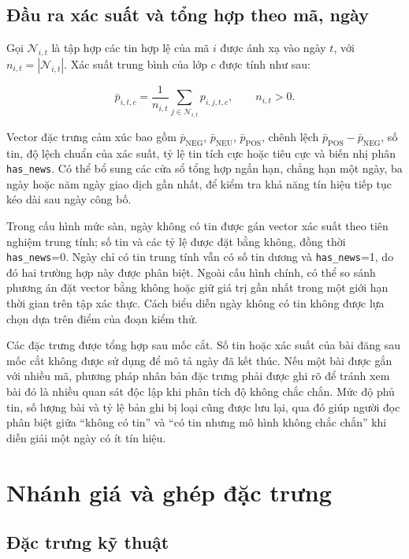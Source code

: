 \documentclass[12pt, a4paper, oneside]{report}
\begin{document}
\subsection{Đầu ra xác suất và tổng hợp theo mã, ngày}

Gọi $\mathcal{N}_{i,t}$ là tập hợp các tin hợp lệ của mã $i$ được ánh xạ vào ngày $t$, với
$n_{i,t}=|\mathcal{N}_{i,t}|$. Xác suất trung bình của lớp $c$ được tính như sau:

\begin{equation}
  \bar p_{i,t,c}=\frac{1}{n_{i,t}}
  \sum_{j\in\mathcal{N}_{i,t}}p_{i,j,t,c},
  \qquad n_{i,t}>0.
  \label{eq:daily-sentiment}
\end{equation}

Vector đặc trưng cảm xúc bao gồm $\bar p_{\mathrm{NEG}}$, $\bar p_{\mathrm{NEU}}$,
$\bar p_{\mathrm{POS}}$, chênh lệch $\bar p_{\mathrm{POS}}-\bar p_{\mathrm{NEG}}$,
số tin, độ lệch chuẩn của xác suất, tỷ lệ tin tích cực hoặc tiêu cực và biến nhị phân
\texttt{has\_news}. Có thể bổ sung các cửa sổ tổng hợp ngắn hạn, chẳng hạn một ngày, ba ngày
hoặc năm ngày giao dịch gần nhất, để kiểm tra khả năng tín hiệu tiếp tục kéo dài sau ngày
công bố.

Trong cấu hình mức sàn, ngày không có tin được gán vector xác suất theo tiên nghiệm trung
tính; số tin và các tỷ lệ được đặt bằng không, đồng thời \texttt{has\_news}=0. Ngày chỉ có
tin trung tính vẫn có số tin dương và \texttt{has\_news}=1, do đó hai trường hợp này được
phân biệt. Ngoài cấu hình chính, có thể so sánh phương án đặt vector bằng không hoặc giữ giá
trị gần nhất trong một giới hạn thời gian trên tập xác thực. Cách biểu diễn ngày không có tin
không được lựa chọn dựa trên điểm của đoạn kiểm thử.

Các đặc trưng được tổng hợp sau mốc cắt. Số tin hoặc xác suất của bài đăng sau mốc cắt không
được sử dụng để mô tả ngày đã kết thúc. Nếu một bài được gắn với nhiều mã, phương pháp nhân
bản đặc trưng phải được ghi rõ để tránh xem bài đó là nhiều quan sát độc lập khi phân tích
độ không chắc chắn. Mức độ phủ tin, số lượng bài và tỷ lệ bản ghi bị loại cũng được lưu lại,
qua đó giúp người đọc phân biệt giữa ``không có tin'' và ``có tin nhưng mô hình không chắc
chắn'' khi diễn giải một ngày có ít tín hiệu.
\section{Nhánh giá và ghép đặc trưng}
\label{sec:pp-ghep}

\subsection{Đặc trưng kỹ thuật}
\end{document}
